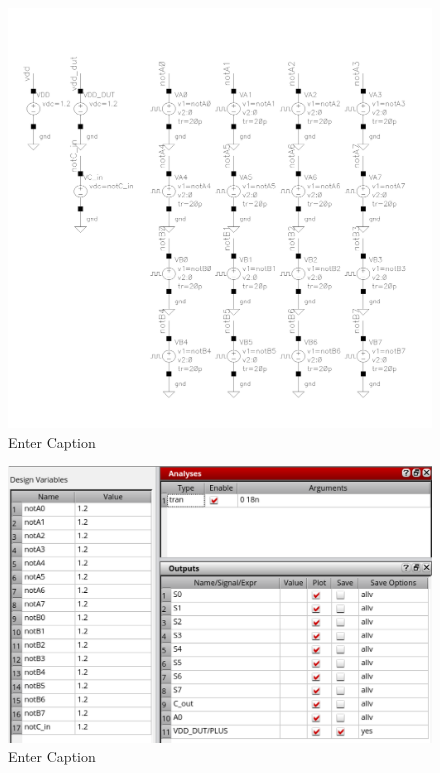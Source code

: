\documentclass[12pt,letterpaper]{article}
\begin{document}
\begin{figure}[H]
    \centering
    \includegraphics[width=\linewidth]{writeup//figures//baseline//active_energy/max_switching_energy_inputs.png}
    \caption{Enter Caption}
\end{figure}

\begin{figure}[H]
    \centering
    \includegraphics[width=\linewidth]{writeup//figures//baseline//active_energy/max_switching_energy_adel.png}
    \caption{Enter Caption}
\end{figure}
\end{document}
